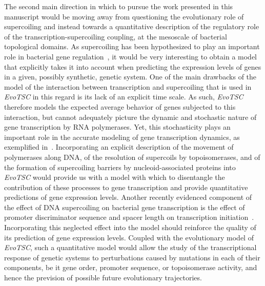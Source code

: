 The second main direction in which to pursue the work presented in this manuscript would be moving away from questioning the evolutionary role of supercoiling and instead towards a quantitative description of the regulatory role of the transcription-supercoiling coupling, at the mesoscale of bacterial topological domains.
As supercoiling has been hypothesized to play an important role in bacterial gene regulation~\citep{elhoudaigui2019}, it would be very interesting to obtain a model that explicitly takes it into account when predicting the expression levels of genes in a given, possibly synthetic, genetic system.
One of the main drawbacks of the model of the interaction between transcription and supercoiling that is used in \emph{EvoTSC} in this regard is its lack of an explicit time scale.
As such, \emph{EvoTSC} therefore models the expected average behavior of genes subjected to this interaction, but cannot adequately picture the dynamic and stochastic nature of gene transcription by RNA polymerases.
Yet, this stochasticity plays an important role in the accurate modeling of gene transcription dynamics, as exemplified in~\cite{sevier2021}.
Incorporating an explicit description of the movement of polymerases along DNA, of the resolution of supercoils by topoisomerases, and of the formation of supercoiling barriers by nucleoid-associated proteins into \emph{EvoTSC} would provide us with a model with which to disentangle the contribution of these processes to gene transcription and provide quantitative predictions of gene expression levels.
Another recently evidenced component of the effect of DNA supercoiling on bacterial gene transcription is the effect of promoter discriminator sequence and spacer length on transcription initiation~\citep{forquet2021,forquet2022,pineau2022a}.
Incorporating this neglected effect into the model should reinforce the quality of its prediction of gene expression levels.
Coupled with the evolutionary model of \emph{EvoTSC}, such a quantitative model would allow the study of the transcriptional response of genetic systems to perturbations caused by mutations in each of their components, be it gene order, promoter sequence, or topoisomerase activity, and hence the prevision of possible future evolutionary trajectories.
